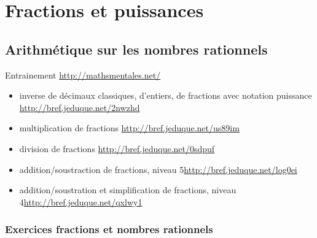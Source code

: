 \documentclass[main.tex]{subfiles}
\begin{document}
 
\cleardoublepage 
{}  
\pagestyle{scrheadings} %
\onehalfspacing 
\setcounter{chapter}{1}
\chapter{Fractions et puissances}

\section{Arithmétique sur les nombres rationnels}
Entrainement \url{http://mathsmentales.net/}
\begin{itemize}
	\item inverse de décimaux classiques, d'entiers, de fractions avec notation puissance \url{http://bref.jeduque.net/2nwzhd}
	\item  multiplication de fractions \url{http://bref.jeduque.net/us89im}
	\item division de fractions \url{http://bref.jeduque.net/0sdpuf}
	\item  addition/soustraction de fractions, niveau 5\ieme \url{http://bref.jeduque.net/log0ei}
	\item addition/soustration et simplification de fractions, niveau 4\ieme  \url{http://bref.jeduque.net/qxlwy1} 
\end{itemize} 
  

\newpage 
{}  
\pagestyle{scrheadings} %
\onehalfspacing
\subsection{Exercices fractions et nombres rationnels}
\end{document}
